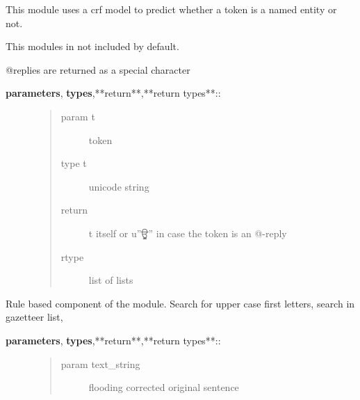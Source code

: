 \documentclass[letterpaper,10pt,english]{sphinxmanual}
\begin{document}
\label{API:module-norm.modules.new_NE}

\begin{fulllineitems}
\label{API:norm.modules.new_NE.New_NE}
This module uses a crf model to predict whether a token is a 
named entity or not.

This modules in not included by default.

\begin{fulllineitems}
\label{API:norm.modules.new_NE.New_NE._replace_atreplies}
@replies are returned as a special character
\begin{description}
\item[{\textbf{parameters}, \textbf{types},**return**,**return types**::}] \leavevmode\begin{quote}\begin{description}
\item[{param t}] \leavevmode
token

\item[{type t}] \leavevmode
unicode string

\item[{return}] \leavevmode
t itself or  u''ਊ'' in case the token is an @-reply

\item[{rtype}] \leavevmode
list of lists

\end{description}\end{quote}

\end{description}

\end{fulllineitems}


\begin{fulllineitems}
\label{API:norm.modules.new_NE.New_NE._run_named_entity_replace}
Rule based component of the module. Search for upper case first letters, search in gazetteer list,
\begin{description}
\item[{\textbf{parameters}, \textbf{types},**return**,**return types**::}] \leavevmode\begin{quote}\begin{description}
\item[{param text\_string}] \leavevmode
flooding corrected original sentence


\end{description}
\end{quote}
\end{description}
\end{fulllineitems}
\end{fulllineitems}
\end{document}
